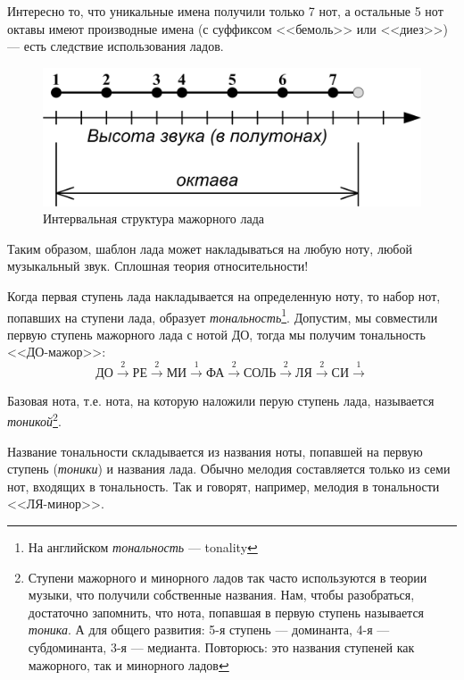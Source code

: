 Интересно то, что уникальные имена получили только 7 нот, а остальные 5 нот октавы имеют производные имена (с суффиксом <<бемоль>> или <<диез>>) --- есть следствие использования ладов.

\begin{figure}[!ht]
    \centering
    \includegraphics{fig/intervals/mode-maj} 
    \caption{Интервальная структура мажорного лада}\label{fig:harmony:lad:mode:maj}
\end{figure} 

Таким образом, шаблон лада может накладываться на любую ноту, любой музыкальный звук. Сплошная теория относительности!

Когда первая ступень лада накладывается на определенную ноту, то набор нот, попавших на ступени лада, образует \emph{тональность}\footnote{На английском \emph{тональность} --- tonality}. Допустим, мы совместили первую ступень мажорного лада с нотой ДО, тогда мы получим тональность <<ДО-мажор>>: 
\[
    \text{ДО}\xrightarrow{2}
    \text{РЕ}\xrightarrow{2}
    \text{МИ}\xrightarrow{1}
    \text{ФА}\xrightarrow{2}
    \text{СОЛЬ}\xrightarrow{2}
    \text{ЛЯ}\xrightarrow{2}
    \text{СИ}\xrightarrow{1}
\]

Базовая нота, т.е. нота, на которую наложили перую ступень лада, называется \emph{тоникой}\footnote{Ступени мажорного и минорного ладов так часто используются в теории музыки, что получили собственные названия. Нам, чтобы разобраться, достаточно запомнить, что нота, попавшая в первую ступень называется \emph{тоника}. А для общего развития: 5-я ступень --- доминанта, 4-я --- субдоминанта, 3-я --- медианта. Повторюсь: это названия ступеней как мажорного, так и минорного ладов}.

Название тональности складывается из названия ноты, попавшей на первую ступень (\emph{тоники}) и названия лада. Обычно мелодия составляется только из семи нот, входящих в тональность. Так и говорят, например, мелодия в тональности <<ЛЯ-минор>>.

